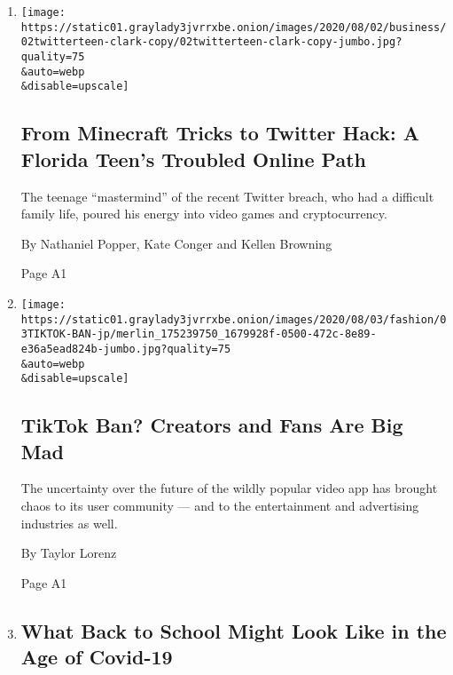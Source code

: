 \begin{enumerate}
\def\labelenumi{\arabic{enumi}.}
\item
  \href{/2020/08/02/technology/florida-teenager-twitter-hack.html}{}

  \texttt{[image: https://static01.graylady3jvrrxbe.onion/images/2020/08/02/business/02twitterteen-clark-copy/02twitterteen-clark-copy-jumbo.jpg?quality=75\\\&auto=webp\\\&disable=upscale]}

  \hypertarget{from-minecraft-tricks-to-twitter-hack-a-florida-teens-troubled-online-path}{%
  \subsection{From Minecraft Tricks to Twitter Hack: A Florida Teen's
  Troubled Online
  Path}\label{from-minecraft-tricks-to-twitter-hack-a-florida-teens-troubled-online-path}}

  The teenage ``mastermind'' of the recent Twitter breach, who had a
  difficult family life, poured his energy into video games and
  cryptocurrency.

  By Nathaniel Popper, Kate Conger and Kellen Browning

  Page A1
\item
  \href{/2020/08/02/style/tiktok-ban-threat-trump.html}{}

  \texttt{[image: https://static01.graylady3jvrrxbe.onion/images/2020/08/03/fashion/03TIKTOK-BAN-jp/merlin\_175239750\_1679928f-0500-472c-8e89-e36a5ead824b-jumbo.jpg?quality=75\\\&auto=webp\\\&disable=upscale]}

  \hypertarget{tiktok-ban-creators-and-fans-are-big-mad}{%
  \subsection{TikTok Ban? Creators and Fans Are Big
  Mad}\label{tiktok-ban-creators-and-fans-are-big-mad}}

  The uncertainty over the future of the wildly popular video app has
  brought chaos to its user community --- and to the entertainment and
  advertising industries as well.

  By Taylor Lorenz

  Page A1
\item
  \href{/interactive/2020/07/29/us/schools-reopening-coronavirus.html}{}

  \hypertarget{what-back-to-school-might-look-like-in-the-age-of-covid-19}{%
  \subsection{What Back to School Might Look Like in the Age of
  Covid-19}\label{what-back-to-school-might-look-like-in-the-age-of-covid-19}}


\end{enumerate}
